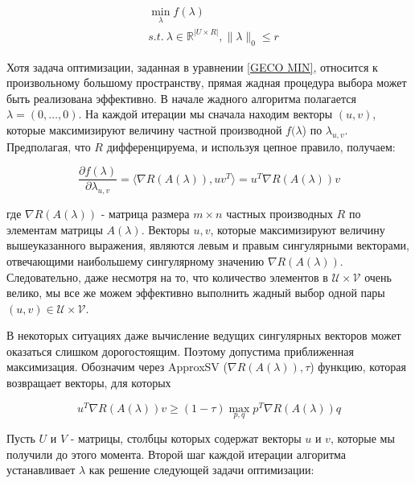 \documentclass[oneside,final,14pt]{extreport} %
\begin{document}
\begin{equation}
	\label{GECO MIN}
	\begin{aligned}
  	& \min_{\lambda} f(\lambda) \\
  	& s.t. \ \lambda \in \mathbb{R}^{|U \times R|}, \| \lambda \|_0 \le r
	\end{aligned}
\end{equation}

Хотя задача оптимизации, заданная в уравнении \ref{GECO MIN}, относится к произвольному большому пространству, прямая жадная процедура выбора может быть реализована эффективно. В начале жадного алгоритма полагается $ \lambda = (0, \ldots, 0) $. На каждой итерации мы сначала находим векторы $ (u, v) $, которые максимизируют величину частной производной $ f (\lambda $) по $ \lambda_ {u, v} $. Предполагая, что $ R $ дифференцируема, и используя цепное правило, получаем:

\begin{equation}
  \frac{\partial f(\lambda)}{\partial \lambda _{u,v}} = \langle \nabla R(A(\lambda)), uv^T \rangle = u^T \nabla R(A(\lambda))v
\end{equation}

где $ \nabla R (A (\lambda)) $ - матрица размера $ m \times n $ частных производных $ R $ по элементам матрицы $ A (\lambda) $. Векторы $ u, v $, которые максимизируют величину вышеуказанного выражения, являются левым и правым сингулярными векторами, отвечающими наибольшему сингулярному значению $ \nabla R (A (\lambda)) $. Следовательно, даже несмотря на то, что количество элементов в $ \mathcal{U} \times \mathcal{V} $ очень велико, мы все же можем эффективно выполнить жадный выбор одной пары $ (u, v) \in \mathcal{U} \times \mathcal{V} $.

В некоторых ситуациях даже вычисление ведущих сингулярных векторов может оказаться слишком дорогостоящим. Поэтому допустима приближенная максимизация. Обозначим через ApproxSV ($ \nabla R (A (\lambda)), \tau $) функцию, которая возвращает векторы, для которых

\begin{equation}
  u^T \nabla R(A(\lambda))v \ge (1 - \tau) \max_{p,q} p^T\nabla R(A(\lambda))q
\end{equation}

Пусть $ U $ и $ V $ - матрицы, столбцы которых содержат векторы $ u $ и $ v $, которые мы получили до этого момента. Второй шаг каждой итерации алгоритма устанавливает $ \lambda $ как решение следующей задачи оптимизации:
\end{document}
